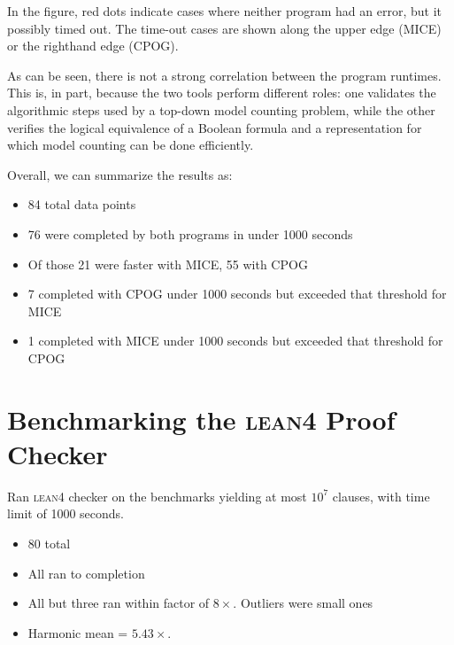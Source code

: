 \documentclass[letterpaper,USenglish,cleveref, autoref, thm-restate]{lipics-v2021}
\newcommand{\program}[1]{\textsc{#1}}
\newcommand{\lean}{\program{lean4}}
\begin{document}
In the figure, red dots indicate cases where neither program had an
error, but it possibly timed out.  The time-out cases are shown along
the upper edge (MICE) or the righthand edge (CPOG).

As can be seen, there is not a strong correlation between the program
runtimes.  This is, in part, because the two tools perform different
roles: one validates the algorithmic steps used by a top-down model
counting problem, while the other verifies the logical equivalence of
a Boolean formula and a representation for which model counting can be
done efficiently.

Overall, we can summarize the results as:
\begin{itemize}
\item 84 total data points
\item 76 were completed by both programs in under 1000 seconds
\item Of those 21 were faster with MICE, 55 with CPOG
\item 7 completed with CPOG under 1000 seconds but exceeded that threshold for MICE
\item 1 completed with MICE under 1000 seconds but exceeded that threshold for CPOG
\end{itemize}


\section{Benchmarking the \lean{} Proof Checker}

Ran \lean{} checker on the benchmarks yielding at most $10^7$ clauses, with time limit of 1000 seconds.
\begin{itemize}
\item 80 total
\item All ran to completion
\item All but three ran within factor of $8\times$.  Outliers were small ones
\item Harmonic mean = $5.43\times$.
\end{itemize}





\end{document}

